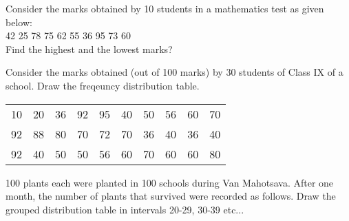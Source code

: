 \item Consider the marks obtained by 10 students in a mathematics test as given below:\\
42 25 78 75 62 55 36 95 73 60\\
Find the highest and the lowest marks?
\item Consider the marks obtained (out of 100 marks) by 30 students of Class IX of a school.  Draw the freqeuncy distribution table.

\begin{tabular}{cccccccccc}
10 &20 &36 &92 &95 &40 &50 &56 &60 &70\\
92 &88 &80 &70 &72 &70 &36 &40 &36 &40\\
92 &40 &50 &50 &56 &60 &70 &60 &60 &80\\
\end{tabular}

\item 100 plants each were planted in 100 schools during Van Mahotsava. After one month, the number of plants that survived were recorded as follows.  Draw the grouped distribution table in intervals 20-29, 30-39 etc...

